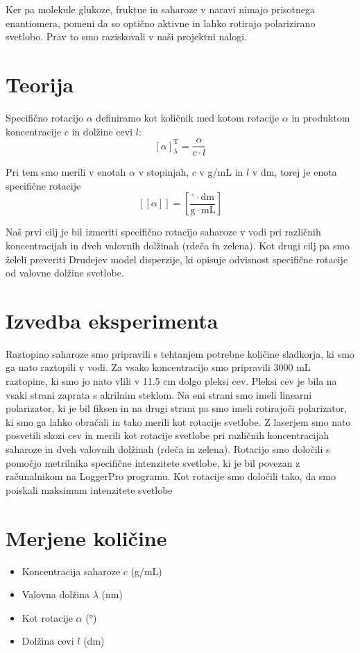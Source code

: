 \documentclass[20pt]{extarticle}
\begin{document}
Ker pa molekule glukoze, fruktue in saharoze v naravi nimajo prisotnega enantiomera, pomeni da so optično aktivne in lahko rotirajo polarizirano svetlobo. Prav to smo raziskovali v naši projektni nalogi.

\section*{Teorija}

Specifično rotacijo $\alpha$ definiramo kot količnik med kotom rotacije $\alpha$ in produktom koncentracije $c$ in dolžine cevi $l$:
\[
[\alpha]^{\text{T}}_{\lambda}= \frac{\alpha}{c \cdot l}
\]

Pri tem smo merili v enotah $\alpha$ v stopinjah, $c$ v g/mL in $l$ v dm, torej je enota specifične rotacije 
\[
\left[ [\alpha] \right] = \left[ \frac{^\circ \cdot \mathrm{dm}}{\mathrm{g} \cdot \mathrm{mL}} \right]
\]


Naš prvi cilj je bil izmeriti specifično rotacijo saharoze v vodi pri različnih koncentracijah in dveh valovnih dolžinah (rdeča in zelena).
Kot drugi cilj pa smo želeli preveriti Drudejev model disperzije, ki opisuje odvisnost specifične rotacije od valovne dolžine svetlobe.

\section*{Izvedba eksperimenta}

Raztopino saharoze smo pripravili s tehtanjem potrebne količine sladkorja, ki smo ga nato raztopili v vodi. Za vsako koncentracijo smo pripravili 3000 mL raztopine, ki smo jo nato vlili v 11.5 cm dolgo pleksi cev.
Pleksi cev je bila na vsaki strani zaprata s akrilnim steklom. Na eni strani smo imeli linearni polarizator, ki je bil fiksen in na drugi strani pa smo imeli rotirajoči polarizator, ki smo ga lahko obračali in tako merili kot rotacije svetlobe.
Z laserjem smo nato posvetili skozi cev in merili kot rotacije svetlobe pri različnih koncentracijah saharoze in dveh valovnih dolžinah (rdeča in zelena). Rotacijo smo določili s 
pomočjo metrilnika specifične intenzitete svetlobe, ki je bil povezan z računalnikom na LoggerPro programu. Kot rotacije smo določili tako, da smo poiskali maksimum intenzitete svetlobe 


\section*{Merjene količine}
\begin{itemize}
    \item Koncentracija saharoze $c$ (g/mL)
    \item Valovna dolžina $\lambda$ (nm)
    \item Kot rotacije $\alpha$ (°)
    \item Dolžina cevi $l$ (dm)
\end{itemize}
\end{document}
